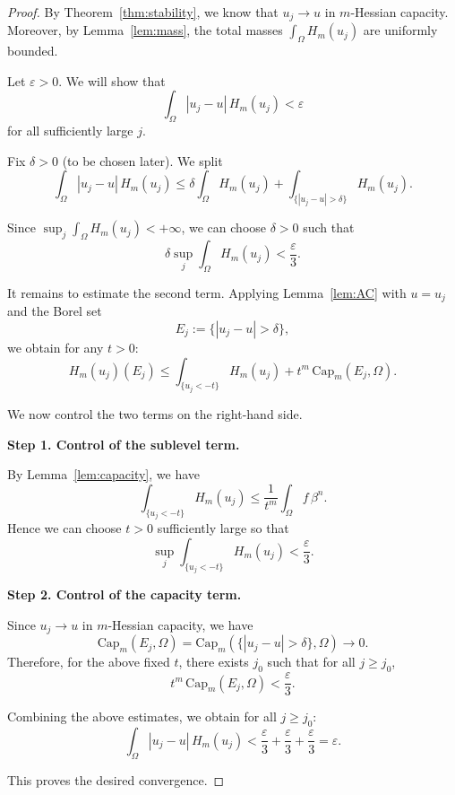 \documentclass[11pt,reqno]{amsart}
\theoremstyle{definition}
\theoremstyle{remark}
\begin{document}
\begin{proof}
	By Theorem~\ref{thm:stability}, we know that $u_j \to u$ in $m$-Hessian capacity. 
	Moreover, by Lemma~\ref{lem:mass}, the total masses $\int_\Omega H_m(u_j)$ are uniformly bounded.
	
	Let $\varepsilon>0$. We will show that
	\[
	\int_\Omega |u_j-u|\,H_m(u_j) < \varepsilon
	\]
	for all sufficiently large $j$.
	
	Fix $\delta>0$ (to be chosen later). We split
	\[
	\int_\Omega |u_j-u|\,H_m(u_j)
	\le 
	\delta \int_\Omega H_m(u_j)
	+
	\int_{\{|u_j-u|>\delta\}} H_m(u_j).
	\]
	
	Since $\sup_j \int_\Omega H_m(u_j) < +\infty$, we can choose $\delta>0$ such that
	\[
	\delta \sup_j \int_\Omega H_m(u_j) < \frac{\varepsilon}{3}.
	\]
	
	It remains to estimate the second term. 
	Applying Lemma~\ref{lem:AC} with $u = u_j$ and the Borel set 
	\[
	E_j := \{|u_j-u|>\delta\},
	\]
	we obtain for any $t>0$:
	\[
	H_m(u_j)(E_j)
	\le 
	\int_{\{u_j<-t\}} H_m(u_j)
	+
	t^m \,\mathrm{Cap}_m(E_j,\Omega).
	\]
	
	We now control the two terms on the right-hand side.
	
	\medskip
	\noindent
	\textbf{Step 1. Control of the sublevel term.}
	
	By Lemma~\ref{lem:capacity}, we have
	\[
	\int_{\{u_j<-t\}} H_m(u_j)
	\le 
	\frac{1}{t^m} \int_\Omega f\,\beta^n.
	\]
	Hence we can choose $t>0$ sufficiently large so that
	\[
	\sup_j \int_{\{u_j<-t\}} H_m(u_j) < \frac{\varepsilon}{3}.
	\]
	
	\medskip
	\noindent
	\textbf{Step 2. Control of the capacity term.}
	
	Since $u_j \to u$ in $m$-Hessian capacity, we have
	\[
	\mathrm{Cap}_m(E_j,\Omega)
	=
	\mathrm{Cap}_m(\{|u_j-u|>\delta\},\Omega)
	\longrightarrow 0.
	\]
	Therefore, for the above fixed $t$, there exists $j_0$ such that for all $j \ge j_0$,
	\[
	t^m \,\mathrm{Cap}_m(E_j,\Omega)
	<
	\frac{\varepsilon}{3}.
	\]
	
	\medskip
	Combining the above estimates, we obtain for all $j \ge j_0$:
	\[
	\int_\Omega |u_j-u|\,H_m(u_j)
	<
	\frac{\varepsilon}{3}
	+
	\frac{\varepsilon}{3}
	+
	\frac{\varepsilon}{3}
	=
	\varepsilon.
	\]
	
	This proves the desired convergence.
\end{proof}
\end{document}
